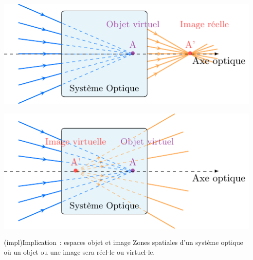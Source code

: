 \documentclass[../../main/main.tex]{subfiles}
\begin{document}
\begin{tcb}[label=exem:rellvirt]
\begin{minipage}{0.45\linewidth}
		\begin{center}
			\includegraphics[width=\linewidth]{obj_v-img_r}
			\label{fig:objvimgr}
		\end{center}
	\end{minipage}
	\hfill
	\begin{minipage}{0.45\linewidth}
		\begin{center}
			\includegraphics[width=\linewidth]{obj_v-img_v}
			\label{fig:objvimgv}
		\end{center}
	\end{minipage}
\end{tcb}

\begin{tcb}[label=impl:objimg_espace](impl){Implication~: espaces objet et image}
	Zones spatiales d'un système optique où un objet ou une image sera réel-le ou
	virtuel-le.
	\begin{center}
	\end{center}
\end{tcb}
\end{document}
